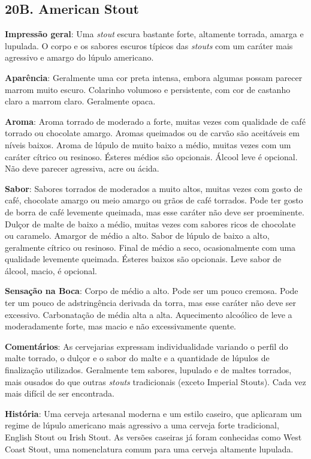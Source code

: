 \subsection*{20B. American Stout}
\textbf{Impressão geral}: Uma \textit{stout} escura bastante forte, altamente torrada, amarga e lupulada. O corpo e os sabores escuros típicos das \textit{stouts} com um caráter mais agressivo e amargo do lúpulo americano.

\textbf{Aparência}: Geralmente uma cor preta intensa, embora algumas possam parecer marrom muito escuro. Colarinho volumoso e persistente, com cor de castanho claro a marrom claro. Geralmente opaca.

\textbf{Aroma}: Aroma torrado de moderado a forte, muitas vezes com qualidade de café torrado ou chocolate amargo. Aromas queimados ou de carvão são aceitáveis em níveis baixos. Aroma de lúpulo de muito baixo a médio, muitas vezes com um caráter cítrico ou resinoso. Ésteres médios são opcionais. Álcool leve é opcional. Não deve parecer agressiva, acre ou ácida.

\textbf{Sabor}: Sabores torrados de moderados a muito altos, muitas vezes com gosto de café, chocolate amargo ou meio amargo ou grãos de café torrados. Pode ter gosto de borra de café levemente queimada, mas esse caráter não deve ser proeminente. Dulçor de malte de baixo a médio, muitas vezes com sabores ricos de chocolate ou caramelo. Amargor de médio a alto. Sabor de lúpulo de baixo a alto, geralmente cítrico ou resinoso. Final de médio a seco, ocasionalmente com uma qualidade levemente queimada. Ésteres baixos são opcionais. Leve sabor de álcool, macio, é opcional.

\textbf{Sensação na Boca}: Corpo de médio a alto. Pode ser um pouco cremosa. Pode ter um pouco de adstringência derivada da torra, mas esse caráter não deve ser excessivo. Carbonatação de média alta a alta. Aquecimento alcoólico de leve a moderadamente forte, mas macio e não excessivamente quente.

\textbf{Comentários}: As cervejarias expressam individualidade variando o perfil do malte torrado, o dulçor e o sabor do malte e a quantidade de lúpulos de finalização utilizados. Geralmente tem sabores, lupulado e de maltes torrados, mais ousados do que outras \textit{stouts} tradicionais (exceto Imperial Stouts). Cada vez mais difícil de ser encontrada.

\textbf{História}: Uma cerveja artesanal moderna e um estilo caseiro, que aplicaram um regime de lúpulo americano mais agressivo a uma cerveja forte tradicional, English Stout ou Irish Stout. As versões caseiras já foram conhecidas como West Coast Stout, uma nomenclatura comum para uma cerveja altamente lupulada.

